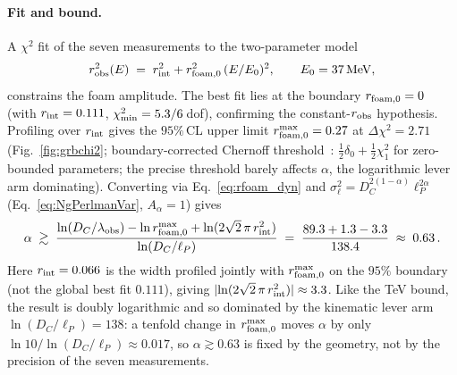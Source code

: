 \documentclass[aps,prd,onecolumn,amsmath,amssymb]{revtex4-2}
\begin{document}
\paragraph{Fit and bound.}
A $\chi^2$ fit of the seven measurements to the two-parameter model
\begin{equation}
  r_{\rm obs}^2(E) \;=\; r_{\rm int}^2 + r_{\rm foam,0}^2\,(E/E_0)^2,
  \qquad E_0=37\,\mathrm{MeV},
  \label{eq:robs_model}
\end{equation}
constrains the foam amplitude.  The best fit lies at the boundary
$r_{\rm foam,0}=0$ (with $r_{\rm int}=0.111$, $\chi^2_{\rm min}=5.3/6$\,dof),
confirming the constant-$r_{\rm obs}$ hypothesis.  Profiling over
$r_{\rm int}$ gives the $95\%$\,CL upper limit
$r_{\rm foam,0}^{\rm max}=0.27$ at $\Delta\chi^2=2.71$ (Fig.~\ref{fig:grbchi2}; boundary-corrected
Chernoff threshold~\cite{Chernoff1954}: $\tfrac12\delta_0+\tfrac12\chi_1^2$
for zero-bounded parameters; the precise threshold barely affects $\alpha$,
the logarithmic lever arm dominating).  Converting
via Eq.~\eqref{eq:rfoam_dyn} and $\sigma_\ell^2=D_C^{2(1-\alpha)}\ell_P^{2\alpha}$
(Eq.~\eqref{eq:NgPerlmanVar}, $A_\alpha=1$) gives
\begin{equation}
  \alpha \;\gtrsim\;
  \frac{\ln(D_C/\lambda_{\rm obs}) - \ln r_{\rm foam,0}^{\rm max}
        + \ln(2\sqrt{2}\,\pi\,r_{\rm int}^2)}
       {\ln(D_C/\ell_P)}
  \;=\; \frac{89.3 + 1.3 - 3.3}{138.4}
  \;\approx\; 0.63\,.
  \label{eq:alpha_grb_dyn}
\end{equation}
Here $r_{\rm int}=0.066$ is the width profiled jointly with
$r_{\rm foam,0}^{\rm max}$ on the $95\%$ boundary (not the global best fit
$0.111$), giving $|\!\ln(2\sqrt2\,\pi\,r_{\rm int}^2)|\approx3.3$.  Like
the TeV bound, the result is doubly logarithmic and so dominated by the
kinematic lever arm $\ln(D_C/\ell_P)=138$: a tenfold change in
$r_{\rm foam,0}^{\rm max}$ moves $\alpha$ by only
$\ln10/\ln(D_C/\ell_P)\approx0.017$, so $\alpha\gtrsim0.63$ is fixed by the
geometry, not by the precision of the seven measurements.
\end{document}
